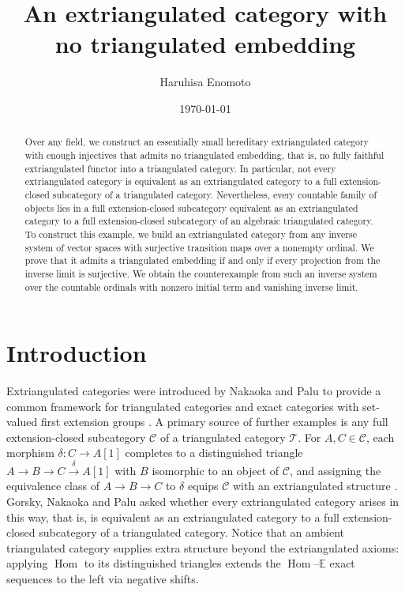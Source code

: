 \documentclass[a4paper,reqno,10pt]{amsart}
\title[An extriangulated category with no triangulated embedding]
{An extriangulated category with no triangulated embedding}
\author[H.\ Enomoto]{Haruhisa Enomoto}
\date{\today}
\numberwithin{equation}{section}
\theoremstyle{definition}
\newcommand{\C}{\mathcal C}
\newcommand{\E}{\mathbb E}
\newcommand{\T}{\mathcal T}
\DeclareMathOperator{\Hom}{Hom}
\begin{document}
\begin{abstract}
Over any field, we construct an essentially small hereditary extriangulated
category with enough injectives that admits no triangulated embedding, that is,
no fully faithful extriangulated functor into a triangulated category. In
particular, not every extriangulated category is equivalent as an
extriangulated category to a full extension-closed subcategory of a
triangulated category. Nevertheless, every countable family of objects lies in
a full extension-closed subcategory equivalent as an extriangulated category to
a full extension-closed subcategory of an algebraic triangulated category. To
construct this example, we build an extriangulated category from any inverse
system of vector spaces with surjective transition maps over a nonempty
ordinal. We prove that it admits a triangulated embedding if and only if every
projection from the inverse limit is surjective. We obtain the counterexample
from such an inverse system over the countable ordinals with nonzero initial
term and vanishing inverse limit.
\end{abstract}
\maketitle

\section{Introduction}

Extriangulated categories were introduced by Nakaoka and Palu
\cite[Definition~2.12]{NP} to provide a common framework for triangulated
categories and exact categories with set-valued first extension groups
\cite[Example~2.13 and Proposition~3.22(1)]{NP}. A primary source of further
examples is any full extension-closed subcategory $\C$ of a triangulated
category $\T$. For $A,C\in\C$, each morphism $\delta:C\to A[1]$ completes to a
distinguished triangle $A\to B\to C\xrightarrow{\delta}A[1]$ with $B$
isomorphic to an object of $\C$, and assigning the equivalence class of
$A\to B\to C$ to $\delta$ equips $\C$ with an extriangulated structure
\cite[Remark~2.18]{NP}. Gorsky, Nakaoka and Palu \cite[\S1, opening
paragraph]{GNP} asked whether every extriangulated category arises in this way,
that is, is equivalent as an extriangulated category to a full extension-closed
subcategory of a triangulated category. Notice that an ambient triangulated
category supplies extra structure beyond the extriangulated axioms: applying
$\Hom$ to its distinguished triangles extends the $\Hom$--$\E$ exact sequences
to the left via negative shifts.
\end{document}
